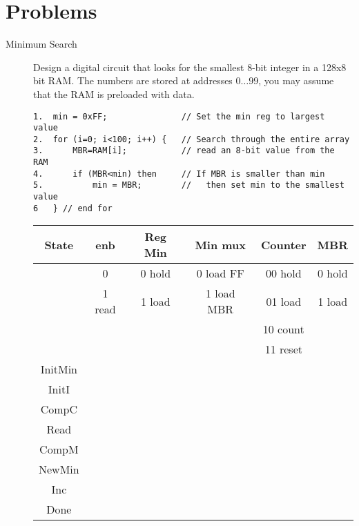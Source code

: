 \section{Problems}
\begin{description}

    \item[Minimum Search]

        Design a digital circuit that looks for the smallest
        8-bit integer in a 128x8 bit RAM.  The numbers
        are stored at addresses $0\ldots 99$, you may assume that the
        RAM is preloaded with data.

\begin{verbatim}
1.  min = 0xFF;               // Set the min reg to largest value
2.  for (i=0; i<100; i++) {   // Search through the entire array
3.      MBR=RAM[i];           // read an 8-bit value from the RAM
4.      if (MBR<min) then     // If MBR is smaller than min
5.          min = MBR;        //   then set min to the smallest value
6   } // end for
\end{verbatim}


        \begin{tabular}{c||c|c|c|c|c}
            State   & enb       &  Reg Min  & Min mux       & Counter & MBR    \\ \hline
            & 0     &  0 hold   & 0 load FF     & 00 hold & 0 hold    \\ \hline
            & 1 read  &  1 load   & 1 load MBR    & 01 load & 1 load    \\ \hline
            &                 &           &               & 10 count&         \\ \hline
            &                &           &               & 11 reset& \\ \hline \hline
            InitMin &            &          &              &       &    \\ \hline
            InitI   &              &          &              &       &    \\ \hline
            CompC   &             &          &              &       &    \\ \hline
            Read    &             &          &              &       &    \\ \hline
            CompM   &           &          &              &       &    \\ \hline
            NewMin  &             &          &              &       &    \\ \hline
            Inc     &             &          &              &       &    \\ \hline
            Done    &             &          &              &       &    \\
        \end{tabular}


\end{description}

